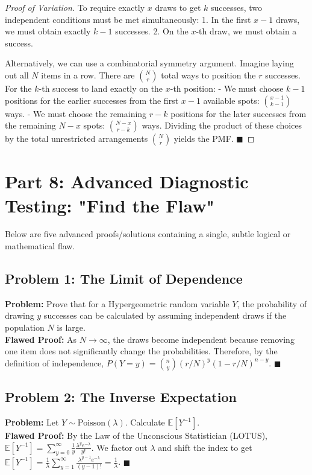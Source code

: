 \documentclass[11pt]{article}
\theoremstyle{definition}
\theoremstyle{remark}
\begin{document}
\begin{proof}[Proof of Variation]
To require exactly $x$ draws to get $k$ successes, two independent conditions must be met simultaneously:
1. In the first $x-1$ draws, we must obtain exactly $k-1$ successes.
2. On the $x$-th draw, we must obtain a success.

Alternatively, we can use a combinatorial symmetry argument. Imagine laying out all $N$ items in a row. There are $\binom{N}{r}$ total ways to position the $r$ successes. 
For the $k$-th success to land exactly on the $x$-th position:
- We must choose $k-1$ positions for the earlier successes from the first $x-1$ available spots: $\binom{x-1}{k-1}$ ways.
- We must choose the remaining $r-k$ positions for the later successes from the remaining $N-x$ spots: $\binom{N-x}{r-k}$ ways.
Dividing the product of these choices by the total unrestricted arrangements $\binom{N}{r}$ yields the PMF. $\blacksquare$
\end{proof}

\newpage
\section{Part 8: Advanced Diagnostic Testing: "Find the Flaw"}

Below are five advanced proofs/solutions containing a single, subtle logical or mathematical flaw. 

\subsection{Problem 1: The Limit of Dependence}
\textbf{Problem:} Prove that for a Hypergeometric random variable $Y$, the probability of drawing $y$ successes can be calculated by assuming independent draws if the population $N$ is large. \\
\textbf{Flawed Proof:} As $N \to \infty$, the draws become independent because removing one item does not significantly change the probabilities. Therefore, by the definition of independence, $P(Y=y) = \binom{n}{y} (r/N)^y (1 - r/N)^{n-y}$. $\blacksquare$

\subsection{Problem 2: The Inverse Expectation}
\textbf{Problem:} Let $Y \sim \text{Poisson}(\lambda)$. Calculate $\mathbb{E}[Y^{-1}]$. \\
\textbf{Flawed Proof:} By the Law of the Unconscious Statistician (LOTUS), $\mathbb{E}[Y^{-1}] = \sum_{y=0}^\infty \frac{1}{y} \frac{\lambda^y e^{-\lambda}}{y!}$. We factor out $\lambda$ and shift the index to get $\mathbb{E}[Y^{-1}] = \frac{1}{\lambda} \sum_{y=1}^\infty \frac{\lambda^{y-1} e^{-\lambda}}{(y-1)!} = \frac{1}{\lambda}$. $\blacksquare$
\end{document}
